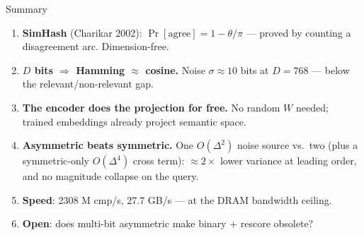 \documentclass[aspectratio=169,12pt]{beamer}
\begin{document}
\begin{frame}{Summary}

\begin{enumerate}
  \setlength\itemsep{4pt}
  \item \textbf{SimHash} (Charikar 2002): $\Pr[\text{agree}] = 1 - \theta/\pi$ —
    proved by counting a disagreement arc. Dimension-free.

  \item \textbf{$D$ bits $\Rightarrow$ Hamming $\approx$ cosine.}
    Noise $\sigma \approx 10$ bits at $D=768$ — below the relevant/non-relevant gap.

  \item \textbf{The encoder does the projection for free.}
    No random $W$ needed; trained embeddings already project semantic space.

  \item \textbf{Asymmetric beats symmetric.}
    One $O(\Delta^2)$ noise source vs.\ two (plus a symmetric-only $O(\Delta^4)$ cross term):
    $\approx 2\times$ lower variance at leading order, and no magnitude collapse on the query.

  \item \textbf{Speed}: 2308 M cmp/s, 27.7 GB/s — at the DRAM bandwidth ceiling.

  \item \textbf{Open}: does multi-bit asymmetric make binary + rescore obsolete?
\end{enumerate}

\end{frame}
\end{document}
